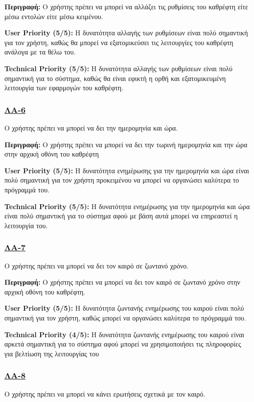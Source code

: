 \noindent\textbf{Περιγραφή:} Ο χρήστης πρέπει να μπορεί να αλλάζει τις ρυθμίσεις του καθρέφτη είτε μέσω εντολών είτε μέσω κειμένου.

\noindent\textbf{User Priority (5/5):} Η δυνατότητα αλλαγής των ρυθμίσεων είναι πολύ σημαντική για τον χρήστη, καθώς θα μπορεί να εξατομικεύσει τις λειτουργίες του καθρέφτη ανάλογα με τα θέλω του.

\noindent\textbf{Technical Priority (5/5):} Η δυνατότητα αλλαγής των ρυθμίσεων είναι πολύ σημαντική για το σύστημα, καθώς θα είναι εφικτή η ορθή και εξατομικευμένη λειτουργία των εφαρμογών του καθρέφτη.

\subsubsection{\underline{ΛΑ-6}}
\noindent Ο χρήστης πρέπει να μπορεί να δει την ημερομηνία και ώρα.

\noindent\textbf{Περιγραφή:} Ο χρήστης πρέπει να μπορεί να δει την τωρινή ημερομηνία και την ώρα στην αρχική οθόνη του καθρέφτη

\noindent\textbf{User Priority (5/5):} Η δυνατότητα ενημέρωσης για την ημερομηνία και ώρα είναι πολύ σημαντική για τον χρήστη προκειμένου να μπορεί να οργανώσει καλύτερα το πρόγραμμά του.

\noindent\textbf{Technical Priority (5/5):} Η δυνατότητα ενημέρωσης για την ημερομηνία και ώρα είναι πολύ σημαντική για το σύστημα αφού με βάση αυτά μπορεί να επηρεαστεί η λειτουργία του.

\subsubsection{\underline{ΛΑ-7}}
\noindent Ο χρήστης πρέπει να μπορεί να δει τον καιρό σε ζωντανό χρόνο.

\noindent\textbf{Περιγραφή:} Ο χρήστης πρέπει να μπορεί να δει τον καιρό σε ζωντανό χρόνο στην αρχική οθόνη του καθρέφτη.

\noindent\textbf{User Priority (5/5):} Η δυνατότητα ζωντανής ενημέρωσης του καιρού είναι πολύ σημαντική για τον χρήστη, καθώς μπορεί να οργανώσει καλύτερα το πρόγραμμά του.

\noindent\textbf{Technical Priority (4/5):} Η δυνατότητα ζωντανής ενημέρωσης του καιρού είναι αρκετά σημαντική για το σύστημα αφού μπορεί να χρησιμοποιήσει τις πληροφορίες για βελτίωση της λειτουργίας του

\subsubsection{\underline{ΛΑ-8}}
\noindent Ο χρήστης πρέπει να μπορεί να κάνει ερωτήσεις σχετικά με τον καιρό.

